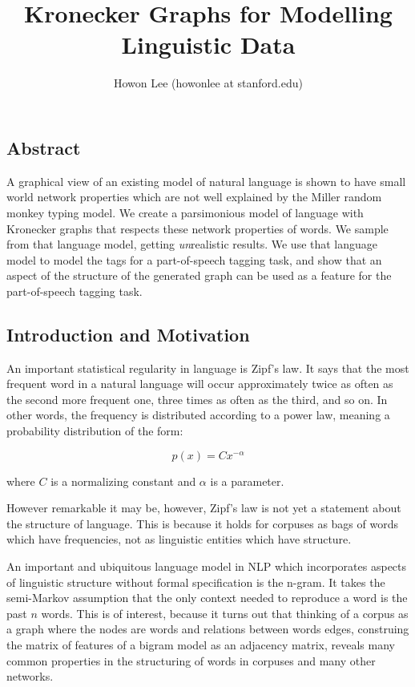 \documentclass[12pt]{article}
\begin{document}
\title{Kronecker Graphs for Modelling Linguistic Data}
\author{Howon Lee (howonlee at stanford.edu)}
\maketitle

\subsection*{Abstract}
A graphical view of an existing model of natural language is shown to have small world network properties which are not well explained by the Miller random monkey typing model. We create a parsimonious model of language with Kronecker graphs that respects these network properties of words. We sample from that language model, getting \emph{un}realistic results. We use that language model to model the tags for a part-of-speech tagging task, and show that an aspect of the structure of the generated graph can be used as a feature for the part-of-speech tagging task.

\subsection*{Introduction and Motivation}

An important statistical regularity in language is Zipf's law. It says that the most frequent word in a natural language will occur approximately twice as often as the second more frequent one, three times as often as the third, and so on. In other words, the frequency is distributed according to a power law, meaning a probability distribution of the form:

$$p(x) = Cx^{-\alpha} $$

where $C$ is a normalizing constant and $\alpha$ is a parameter.

However remarkable it may be, however, Zipf's law is not yet a statement about the structure of language. This is because it holds for corpuses as bags of words which have frequencies, not as linguistic entities which have structure. \cite{smallworldlang}

An important and ubiquitous language model in NLP which incorporates aspects of linguistic structure without formal specification is the n-gram. It takes the semi-Markov assumption that the only context needed to reproduce a word is the past $n$ words. This is of interest, because it turns out that thinking of a corpus as a graph where the nodes are words and relations between words edges, construing the matrix of features of a bigram model as an adjacency matrix, reveals many common properties in the structuring of words in corpuses and many other networks.
\end{document}
